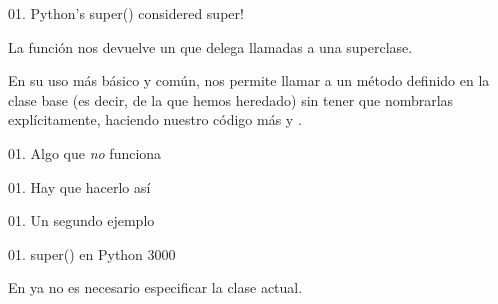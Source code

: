 
\begin{frame}{01. Python's super() considered super!}
  \begin{block}{}
    \large
    \centering
    La función  nos devuelve un  que delega llamadas a una superclase.
  \end{block}

  \vspace{0.35cm}

 \begin{justify}
   En su uso más básico y común, nos permite llamar a un método
   definido en la clase base (es decir, de la que hemos heredado) sin
   tener que nombrarlas explícitamente, haciendo nuestro código más
    y .
 \end{justify}
\end{frame}

\begin{frame}{01. Algo que \emph{no} funciona}
  \footnotesize
  \vspace{0.10cm}
\end{frame}

\begin{frame}{01. Hay que hacerlo así}
  \footnotesize
\end{frame}

\begin{frame}{01. Un segundo ejemplo}
  \footnotesize
  \scriptsize
\end{frame}

\begin{frame}{01. super() en Python 3000}

  \begin{center}
    En  ya no es necesario especificar la clase actual.
  \end{center}

  \footnotesize
\end{frame}

